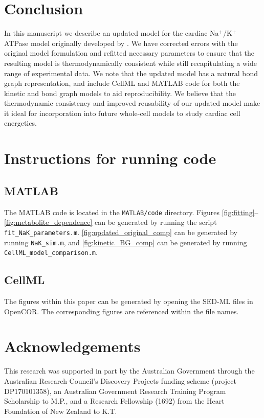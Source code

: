 \documentclass[fleqn,10pt]{physiome}
\begin{document}
\section{Conclusion}
In this manuscript we describe an updated model for the cardiac Na$^+$/K$^+$ ATPase model originally developed by  \citet{terkildsen_balance_2007}. We have corrected errors with the original model formulation and refitted necessary parameters to ensure that the resulting model is thermodynamically consistent while still recapitulating a wide range of experimental data. We note that the updated model has a natural bond graph representation, and include CellML and MATLAB code for both the kinetic and bond graph models to aid reproducibility. We believe that the thermodynamic consistency and improved reusability of our updated model make it ideal for incorporation into future whole-cell models to study cardiac cell energetics.

\section{Instructions for running code}
\subsection{MATLAB}
The MATLAB code is located in the \texttt{MATLAB/code} directory. Figures \ref{fig:fitting}--\ref{fig:metabolite_dependence} can be generated by running the script \texttt{fit\_NaK\_parameters.m}. \autoref{fig:updated_original_comp} can be generated by running \texttt{NaK\_sim.m}, and \autoref{fig:kinetic_BG_comp} can be generated by running \texttt{CellML\_model\_comparison.m}.

\subsection{CellML}
The figures within this paper can be generated by opening the SED-ML files in OpenCOR. The corresponding figures are referenced within the file names.

\section{Acknowledgements}
This research was supported in part by the Australian Government through the Australian Research Council's Discovery Projects funding scheme (project DP170101358), an Australian Government Research Training Program Scholarship to M.P., and a Research Fellowship (1692) from the Heart Foundation of New Zealand to K.T.
\end{document}
